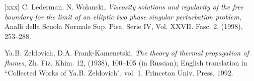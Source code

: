 \begin{thebibliography}{[xxx]}
 C. Lederman, N. Wolanski, {\it Viscosity solutions and 
regularity of the free boundary for the limit of an elliptic two phase 
singular perturbation problem},  Analli della Scuola Normale
Sup. Pisa. Serie IV, Vol. XXVII. Fasc. 2, (1998), 253--288.

 Ya.B. Zeldovich, D.A. Frank-Kamenetski,
{\it The theory of thermal propagation of flames},
 Zh. Fiz. Khim. 12,  (1938), 100--105  (in Russian);
English translation in ``Collected Works of  Ya.B.   Zeldovich",
vol. 1, Princeton Univ. Press,  1992.


\end{thebibliography}



